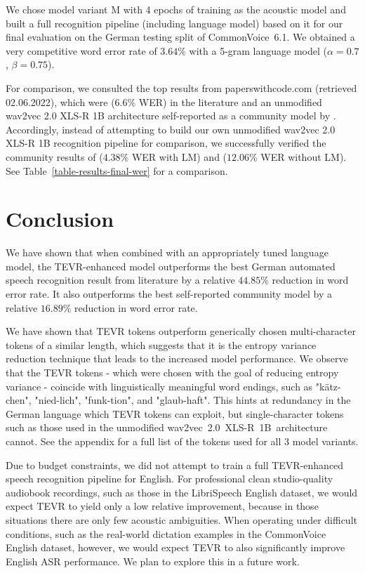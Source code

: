 We chose model variant M with 4 epochs of training as the acoustic model and built a full recognition pipeline (including language model) based on it for our final evaluation on  the German testing split of CommonVoice~6.1. We obtained a very competitive word error rate of $3.64\%$ with a 5-gram language model ($\alpha = 0.7$, $\beta = 0.75$). 

For comparison, we consulted the top results from paperswithcode.com (retrieved 02.06.2022), which were \citet{scribosermo} ($6.6\%$ WER) in the literature and an unmodified wav2vec 2.0 XLS-R 1B architecture self-reported as a community model by \citet{flozi}.
Accordingly, instead of attempting to build our own unmodified wav2vec 2.0 XLS-R 1B recognition pipeline for comparison, we successfully verified the community results of \citet{flozi} ($4.38\%$ WER with LM) and \citet{grosman} ($12.06\%$ WER without LM). 
See Table~\ref{table-results-final-wer} for a comparison.

\section{Conclusion}

We have shown that when combined with an appropriately tuned language model, the TEVR-enhanced model outperforms the best German automated speech recognition result from literature by a relative $44.85\%$ reduction in word error rate. 
It also outperforms the best self-reported community model by a relative $16.89\%$ reduction in word error rate.

We have shown that TEVR tokens outperform generically chosen multi-character tokens of a similar length, which suggests that it is the entropy variance reduction technique that leads to the increased model performance. 
We observe that the TEVR tokens - which were chosen with the goal of reducing entropy variance -  coincide with linguistically meaningful word endings, such as "kätz-chen", "nied-lich", "funk-tion", and "glaub-haft". This hints at redundancy in the German language which TEVR tokens can exploit, but single-character tokens such as those used in the unmodified wav2vec~2.0~XLS-R~1B~architecture cannot. See the appendix for a full list of the tokens used for all 3 model variants.

Due to budget constraints, we did not attempt to train a full TEVR-enhanced speech recognition pipeline for English. For professional clean studio-quality audiobook recordings, such as those in the LibriSpeech English dataset, we would expect TEVR to yield only a low relative improvement, because in those situations there are only few acoustic ambiguities. When operating under difficult conditions, such as the real-world dictation examples in the CommonVoice English dataset, however, we would expect TEVR to also significantly improve English ASR performance. We plan to explore this in a future work.

